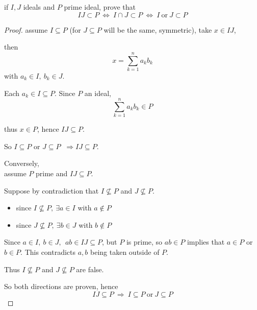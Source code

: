 \documentclass{article}
\theoremstyle{definition}
\newenvironment{ex}[1]
{\renewcommand\theinnerex{#1}\innerex}
{\endinnerex}
\begin{document}
\begin{ex}{R.1.12.a}
  if $I,J$ ideals and $P$ prime ideal, prove that
  $$IJ \subset P ~\Longleftrightarrow~ I \cap J \subset P ~\Longleftrightarrow~ I ~\text{or}~ J \subset P$$
\end{ex}
\begin{proof}
  assume $I \subseteq P$ (for $J \subseteq P$ will be the same, symmetric), take $x \in IJ$,

  then
  $$x = \sum_{k=1}^n a_k b_k$$
  with $a_k \in I,~ b_k \in J$.

  Each $a_k \in I \subseteq P$. Since $P$ an ideal,
  $$\sum_{k=1}^n a_k b_k \in P$$

  thus $x \in P$, hence $IJ \subseteq P$.

  So $I \subseteq P$ or $J \subseteq P$ $~\Longrightarrow IJ \subseteq P$.

  \vspace{0.5cm}
  Conversely,\\
  assume $P$ prime and $IJ \subseteq P$.

  Suppose by contradiction that $I \not\subseteq P$ and $J \not\subseteq P$.
  \begin{itemize}
    \item[-] since $I \not\subseteq P,~ \exists a \in I$ with $a \not\in P$
    \item[-] since $J \not\subseteq P,~ \exists b \in J$ with $b \not\in P$
  \end{itemize}
  Since $a \in I,~ b \in J,~~ ab \in IJ \subseteq P$, but $P$ is prime, so $ab \in P$ implies that $a \in P$ or $b \in P$. This contradicts $a,b$ being taken outside of $P$.

  Thus $I \not\subseteq P$ and $J \not\subseteq P$ are false.

  \vspace{0.3cm}
  So both directions are proven, hence
  $$IJ \subseteq P ~\Longrightarrow~ I \subseteq P ~\text{or}~ J \subseteq P$$

\end{proof}
\end{document}
